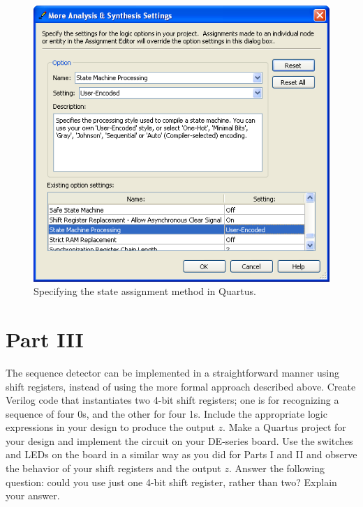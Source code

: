 \documentclass[epsfig,10pt,fullpage]{article}
\begin{document}
\begin{figure}[H]
\centerline{
\includegraphics[scale = 0.75]{figures/figure4.png}}
\caption{Specifying the state assignment method in Quartus.}
\label{fig:fig7_4}
\end{figure}

\section*{Part III}
The sequence detector can be implemented in a straightforward manner using shift registers,
instead of using the more formal approach described above. Create Verilog code that
instantiates two 4-bit shift registers; one is for recognizing a sequence of four 0s, and
the other for four 1s. Include the appropriate logic expressions in your design
to produce the output $z$. Make a Quartus project for your design and implement
the circuit on your DE-series board. Use the switches and LEDs on the board in a similar way as
you did for Parts I and II and observe the behavior of your shift registers and the
output $z$. Answer the following question: could you use just one 4-bit shift
register, rather than two? Explain your answer.

~\newpage
\end{document}
